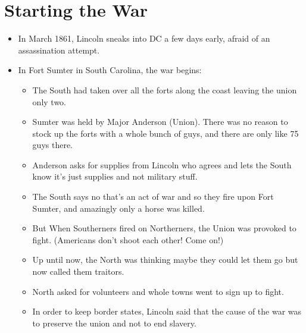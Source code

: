 \documentclass{article}
\begin{document}
\section{Starting the War}
  \begin{itemize}
    \item In March 1861, Lincoln sneaks into DC a few days early, afraid of an assassination attempt.
    \item In Fort Sumter in South Carolina, the war begins:
      \begin{itemize}
        \item The South had taken over all the forts along the coast leaving the union only two.
        \item Sumter was held by Major Anderson (Union). There was no reason to stock up the forts with a whole bunch of guys, and there are only like 75 guys there.
        \item Anderson asks for supplies from Lincoln who agrees and lets the South know it's just supplies and not military stuff. 
        \item The South says no that's an act of war and so they fire upon Fort Sumter, and amazingly only a horse was killed.
        \item But  When Southerners fired on Northerners, the Union was provoked to fight. (Americans don't shoot each other! Come on!)
        \item Up until now, the North was thinking maybe they could let them go but now called them traitors. 
        \item North asked for volunteers and whole towns went to sign up to fight.
        \item In order to keep border states, Lincoln said that the cause of the war was to preserve the union and not to end slavery.
      \end{itemize}
    \end{itemize}
\end{document}
